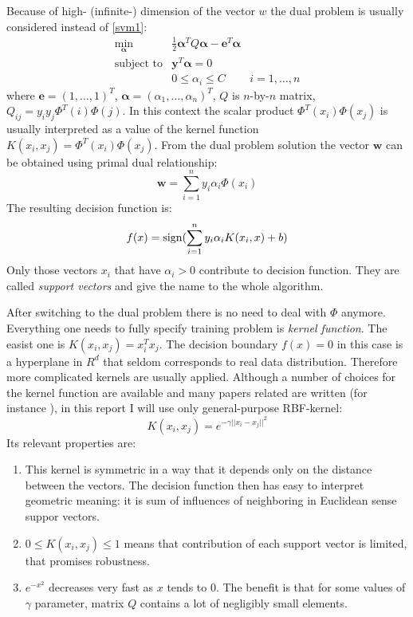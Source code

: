 Because of high- (infinite-) dimension of the vector $w$ the dual problem is usually considered instead of \ref{svm1}:
\begin{equation}
\begin{array}{ccc}
\underset{\mathbf{\bm{\alpha}}}{\min} & \frac{1}{2} \bm{\alpha}^T Q \bm{\alpha} - \bm{e}^T \bm{\alpha} \\
\textrm{subject to} & \bm{y}^T \bm{\alpha} = 0 \\
& 0 \leq \alpha_i \leq C & i=1,\ldots,n
\end{array}
\label{svm2}
\end{equation}
where $\bm{e}=\left(1,\ldots,1\right)^T$, $\bm{\alpha} = \left( \alpha_1, \ldots, \alpha_n \right)^T$, $Q$ is $n$-by-$n$ matrix, $Q_{ij}= y_i y_j \Phi^T(i) \Phi(j)$. In this context the scalar product $\Phi^T(x_i) \Phi(x_j)$ is usually interpreted as a value of the kernel function $K(x_i, x_j) = \Phi^T(x_i) \Phi(x_j)$. From the dual problem solution the vector $\bm{w}$ can be obtained using primal dual relationship:
\begin{equation}
\bm{w}=\sum\limits_{i=1}^n y_i \alpha_i \Phi(x_i)
\end{equation}
The resulting decision function is:
\begin{equation}
f(x) = \operatorname{sign}( \sum\limits_{i=1}^n y_i \alpha_i K(x_i, x)+ b)
\end{equation}
Only those vectors $x_i$ that have $\alpha_i > 0$ contribute to decision function. They are called \textit{support vectors} and give the name to the whole algorithm.

After switching to the dual problem there is no need to deal with $\Phi$ anymore. Everything one needs to fully specify training problem is \textit{kernel function}. The easist one is $K(x_i, x_j) = x_i^T x_j$. The decision boundary $f(x)=0$ in this case is a hyperplane in $R^d$ that seldom corresponds to real data distribution. Therefore more complicated kernels are usually applied. Although a number of choices for the kernel function are available and many papers related are written (for instance \cite{lin2003study}), in this report I will use only general-purpose RBF-kernel:
\begin{equation}
K(x_i, x_j) = e^{-\gamma ||x_i - x_j||^2}
\end{equation}
Its relevant properties are:
\begin{enumerate}
\item
This kernel is symmetric in a way that it depends only on the distance between the vectors. The decision function then has easy to interpret geometric meaning: it is sum of influences of neighboring in Euclidean sense suppor vectors.
\item
$0 \leq K(x_i, x_j) \leq 1$ means that contribution of each support vector is limited, that promises robustness. 
\item
$e^{-x^2}$ decreases very fast as $x$ tends to $0$. The benefit is that for some values of $\gamma$ parameter, matrix $Q$ contains a lot of negligibly small elements.
\end{enumerate}
